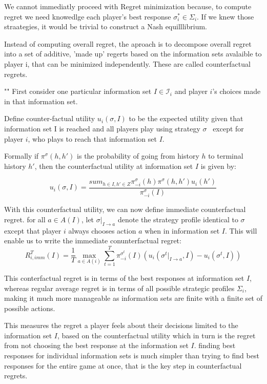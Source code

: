 \documentclass{article}
\begin{document}
We cannot immediatly proceed with Regret minimization because, to compute regret we need knowedlge each player's best response $\sigma^*_i \in \Sigma_i$. If we knew those straategies, it would be trivial to construct a Nash equilllibrium. 

Instead of computing overall regret, the aproach is to decompose overall regret into a set of additive, 'made up' regerts based on the information sets avalaible to player i, that can be minimized independently. These are called counterfactual regrets. 

""
First consider one particular information set $I \in \mathcal{I}_i$ and player $i$’s choices made in that
information set.

Define counter-factual utility $u_i( \sigma, I)$ to be the expected utility given that information set I is reached and all players play using strategy $\sigma$  except for player $i$, who plays to reach that information set $I$. 

Formally if $\pi ^{\sigma}(h, h')$ is the probability of going from history $h$ to terminal history $h'$, then the counterfactual utility at information set $I$ is given by:

\[ u_i(\sigma, I) = \frac{sum_{h \in I, h' \in Z} \pi_{-i}^{\sigma}(h) \pi^{\sigma}(h, h')u_i(h')}{\pi_{-i}^{\sigma}(I)} \]

With this counterfactual utility, we can now define immediate counterfactual regret. for all $a \in A(I)$, let $\sigma|_{I \rightarrow a}$ denote the strategy profile identical to $\sigma$ except that player $i$ always chooses action $a$ when in information set $I$. This will enable us to write the immediate conunterfactual regret: 
\[
R_{i, imm}^T(I) = \frac{1}{T} \max_{a \in A(i)} \sum_{t=1}^T \pi_{-i}^{\sigma^t}(I)(u_i(\sigma^t|_{I \rightarrow a}, I) - u_i(\sigma^t, I)) 
\]

This conterfactual  regret is in terms of the best responses  at information set $I$, whereas regular average regret is in terms of all possible strategic profiles $\Sigma_i$, making it much more manageable as information sets are finite with a finite set of possible actions. 

This measures the regret a player feels about their decisions limited to the information set $I$, based on the counterfactual utility which in turn is the regret from not choosing the best response at the information set $I$. finding best responses for individual information sets is much simpler than trying to find best responses for the entire game at once, that is the key step in counterfactual regrets. 
\end{document}
